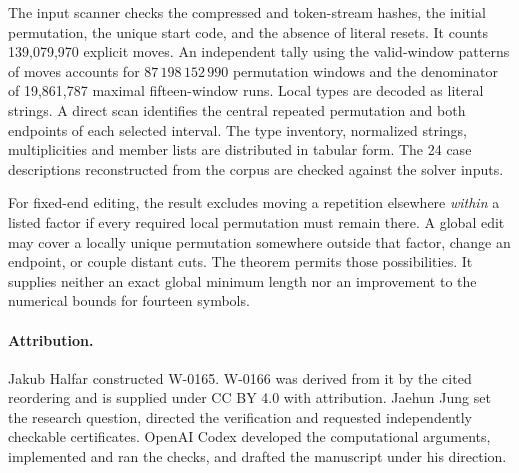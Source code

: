 \documentclass[11pt]{article}
\begin{document}
The input scanner checks the compressed and token-stream hashes, the initial permutation, the unique start code, and the absence of literal resets. It counts 139,079,970 explicit moves. An independent tally using the valid-window patterns of moves accounts for \(87\,198\,152\,990\) permutation windows and the denominator of 19,861,787 maximal fifteen-window runs. Local types are decoded as literal strings. A direct scan identifies the central repeated permutation and both endpoints of each selected interval. The type inventory, normalized strings, multiplicities and member lists are distributed in tabular form. The 24 case descriptions reconstructed from the corpus are checked against the solver inputs.

For fixed-end editing, the result excludes moving a repetition elsewhere \emph{within} a listed factor if every required local permutation must remain there. A global edit may cover a locally unique permutation somewhere outside that factor, change an endpoint, or couple distant cuts. The theorem permits those possibilities. It supplies neither an exact global minimum length nor an improvement to the numerical bounds for fourteen symbols.

\paragraph{Attribution.} Jakub Halfar constructed W-0165. W-0166 was derived from it by the cited reordering and is supplied under CC BY 4.0 with attribution. Jaehun Jung set the research question, directed the verification and requested independently checkable certificates. OpenAI Codex developed the computational arguments, implemented and ran the checks, and drafted the manuscript under his direction.
\end{document}
